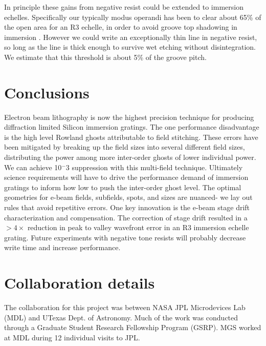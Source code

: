 \documentclass[]{spie}  %
\begin{document}
In principle these gains from negative resist could be extended to immersion echelles.  Specifically our typically modus operandi has been to clear about 65\% of the open area for an R3 echelle, in order to avoid groove top shadowing in immersion \cite{2012SPIE.8450E..2SG}.  However we could write an exceptionally thin line in negative resist, so long as the line is thick enough to survive wet etching without disintegration.  We estimate that this threshold is about 5\% of the groove pitch.  


\section{Conclusions}
Electron beam lithography is now the highest precision technique for producing diffraction limited Silicon immersion gratings.  The one performance disadvantage is the high level Rowland ghosts attributable to field stitching.  These errors have been mitigated by breaking up the field sizes into several different field sizes, distributing the power among more inter-order ghosts of lower individual power.  We can achieve 10$^-3$ suppression with this multi-field technique.  Ultimately science requirements will have to drive the performance demand of immersion gratings to inform how low to push the inter-order ghost level.  The optimal geometries for e-beam fields, subfields, spots, and sizes are nuanced- we lay out rules that avoid repetitive errors.  One key innovation is the e-beam stage drift characterization and compensation.  The correction of stage drift resulted in a $>4\times$ reduction in peak to valley wavefront error in an R3 immersion echelle grating.  Future experiments with negative tone resists will probably decrease write time and increase performance.


\appendix    %
\section{Collaboration details} \label{sec:GSRP}
The collaboration for this project was between NASA JPL Microdevices Lab (MDL) and UTexas Dept. of Astronomy.  Much of the work was conducted through a Graduate Student Research Fellowship Program (GSRP).  MGS worked at MDL during 12 individual visits to JPL.
\end{document}
